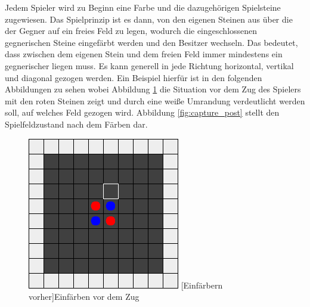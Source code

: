 \documentclass[12pt,a4paper,bibliography=totocnumbered,listof=totocnumbered]{article}
\begin{document}
Jedem Spieler wird zu Beginn eine Farbe und die dazugehörigen Spielsteine zugewiesen. Das Spielprinzip ist es dann, von den eigenen Steinen aus über die der Gegner auf ein freies Feld zu legen, wodurch die eingeschlossenen gegnerischen Steine eingefärbt werden und den Besitzer wechseln. Das bedeutet, dass zwischen dem eigenen Stein und dem freien Feld immer mindestens ein gegnerischer liegen muss. Es kann generell in jede Richtung horizontal, vertikal und diagonal gezogen werden. Ein Beispiel hierfür ist in den folgenden Abbildungen zu sehen wobei Abbildung \ref{fig:capture_pre} die Situation vor dem Zug des Spielers mit den roten Steinen zeigt und durch eine weiße Umrandung verdeutlicht werden soll, auf welches Feld gezogen wird. Abbildung \ref{fig:capture_post} stellt den Spielfeldzustand nach dem Färben dar.

\begin{figure}[H]
\centering
\begin{minipage}[c]{0.4\textwidth}
	\centering
	\includegraphics[width=\textwidth]{pics/reversi_original_map_capture_1.png}
	[Einfärbern vorher]{Einfärben vor dem Zug}
	\label{fig:capture_pre}
\end{minipage}
\hspace{0.1\textwidth}
\begin{minipage}[c]{0.4\textwidth}
	\centering

\end{minipage}
\end{figure}
\end{document}
